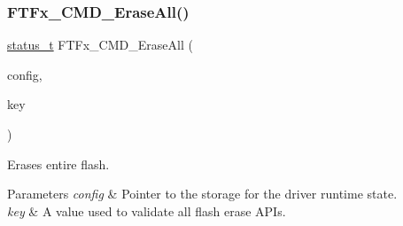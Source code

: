\subsubsection{\texorpdfstring{FTFx\_CMD\_EraseAll()}{FTFx\_CMD\_EraseAll()}}
{\footnotesize\ttfamily \mbox{\hyperlink{group__ksdk__common_gaaabdaf7ee58ca7269bd4bf24efcde092}{status\+\_\+t}} F\+T\+Fx\+\_\+\+C\+M\+D\+\_\+\+Erase\+All (\begin{DoxyParamCaption}\item[{\mbox{\hyperlink{group__ftfx__controller_gab0196063c05bffb4cd2f249699a3378c}{ftfx\+\_\+config\+\_\+t}} $\ast$}]{config,  }\item[{uint32\+\_\+t}]{key }\end{DoxyParamCaption})}



Erases entire flash. 


\begin{DoxyParams}{Parameters}
{\em config} & Pointer to the storage for the driver runtime state. \\
\hline
{\em key} & A value used to validate all flash erase A\+P\+Is.\\
\hline
\end{DoxyParams}

